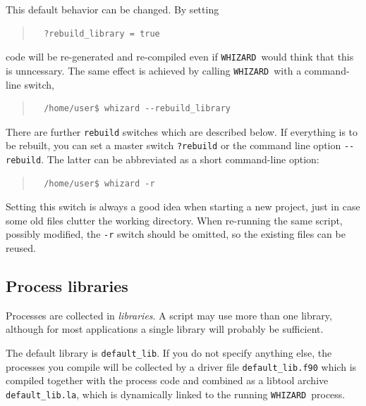 \documentclass[12pt]{book}
\newcommand{\ttt}[1]{\texttt{#1}}
\newcommand{\whizard}{\ttt{WHIZARD}}
\begin{document}
This default behavior can be changed.  By setting
\begin{quote}
\begin{footnotesize}
\begin{verbatim}
  ?rebuild_library = true
\end{verbatim}
\end{footnotesize}
\end{quote}
code will be re-generated and re-compiled even if \whizard\ would think that
this is unncessary.  The same effect is achieved by calling \whizard\ with a
command-line switch,
\begin{quote}
\begin{footnotesize}
\begin{verbatim}
  /home/user$ whizard --rebuild_library
\end{verbatim}
\end{footnotesize}
\end{quote}
There are further \ttt{rebuild} switches which are described below.  If
everything is to be rebuilt, you can set a master switch \ttt{?rebuild} or the
command line option \verb|--rebuild|.  The latter can be abbreviated as a short
command-line option:
\begin{quote}
\begin{footnotesize}
\begin{verbatim}
  /home/user$ whizard -r
\end{verbatim}
\end{footnotesize}
\end{quote}
Setting this switch is always a good idea when starting a new project, just in
case some old files clutter the working directory.  When re-running the same
script, possibly modified, the \verb|-r| switch should be omitted, so the
existing files can be reused.



\subsection{Process libraries}

Processes are collected in \emph{libraries}.  A script may use more than one
library, although for most applications a single library will probably be
sufficient.

The default library is \ttt{default\_lib}.  If you do not specify anything else,
the processes you compile will be collected by a driver file
\ttt{default\_lib.f90} which is compiled together with the process code and
combined as a libtool archive \ttt{default\_lib.la}, which is dynamically linked
to the running \whizard\ process.
\end{document}
